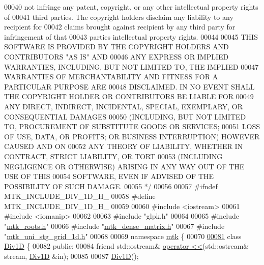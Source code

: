 \begin{DoxyCode}
00040 \textcolor{comment}{not infringe any patent, copyright, or any other intellectual property rights of}
00041 \textcolor{comment}{third parties. The copyright holders disclaim any liability to any recipient for}
00042 \textcolor{comment}{claims brought against recipient by any third party for infringement of that}
00043 \textcolor{comment}{parties intellectual property rights.}
00044 \textcolor{comment}{}
00045 \textcolor{comment}{THIS SOFTWARE IS PROVIDED BY THE COPYRIGHT HOLDERS AND CONTRIBUTORS "AS IS" AND}
00046 \textcolor{comment}{ANY EXPRESS OR IMPLIED WARRANTIES, INCLUDING, BUT NOT LIMITED TO, THE IMPLIED}
00047 \textcolor{comment}{WARRANTIES OF MERCHANTABILITY AND FITNESS FOR A PARTICULAR PURPOSE ARE}
00048 \textcolor{comment}{DISCLAIMED. IN NO EVENT SHALL THE COPYRIGHT HOLDER OR CONTRIBUTORS BE LIABLE FOR}
00049 \textcolor{comment}{ANY DIRECT, INDIRECT, INCIDENTAL, SPECIAL, EXEMPLARY, OR CONSEQUENTIAL DAMAGES}
00050 \textcolor{comment}{(INCLUDING, BUT NOT LIMITED TO, PROCUREMENT OF SUBSTITUTE GOODS OR SERVICES;}
00051 \textcolor{comment}{LOSS OF USE, DATA, OR PROFITS; OR BUSINESS INTERRUPTION) HOWEVER CAUSED AND ON}
00052 \textcolor{comment}{ANY THEORY OF LIABILITY, WHETHER IN CONTRACT, STRICT LIABILITY, OR TORT}
00053 \textcolor{comment}{(INCLUDING NEGLIGENCE OR OTHERWISE) ARISING IN ANY WAY OUT OF THE USE OF THIS}
00054 \textcolor{comment}{SOFTWARE, EVEN IF ADVISED OF THE POSSIBILITY OF SUCH DAMAGE.}
00055 \textcolor{comment}{*/}
00056 
00057 \textcolor{preprocessor}{#ifndef MTK\_INCLUDE\_DIV\_1D\_H\_}
00058 \textcolor{preprocessor}{#define MTK\_INCLUDE\_DIV\_1D\_H\_}
00059 
00060 \textcolor{preprocessor}{#include <iostream>}
00061 \textcolor{preprocessor}{#include <iomanip>}
00062 
00063 \textcolor{preprocessor}{#include "glpk.h"}
00064 
00065 \textcolor{preprocessor}{#include "\hyperlink{mtk__roots_8h}{mtk\_roots.h}"}
00066 \textcolor{preprocessor}{#include "\hyperlink{mtk__dense__matrix_8h}{mtk\_dense\_matrix.h}"}
00067 \textcolor{preprocessor}{#include "\hyperlink{mtk__uni__stg__grid__1d_8h}{mtk\_uni\_stg\_grid\_1d.h}"}
00068 
00069 \textcolor{keyword}{namespace }\hyperlink{namespacemtk}{mtk} \{
00070 
\hypertarget{mtk__div__1d_8h_source_l00081}{}\hyperlink{classmtk_1_1Div1D}{00081} \textcolor{keyword}{class }\hyperlink{classmtk_1_1Div1D}{Div1D} \{
00082  \textcolor{keyword}{public}:
00084   \textcolor{keyword}{friend} std::ostream& \hyperlink{classmtk_1_1Div1D_af3b80aac338975509618e593089e1ed9}{operator <<}(std::ostream& stream, \hyperlink{classmtk_1_1Div1D}{Div1D} &in);
00085 
00087   \hyperlink{classmtk_1_1Div1D_a339c66dd4ed8f50cbeda3645de18e5ab}{Div1D}();

\end{DoxyCode}
